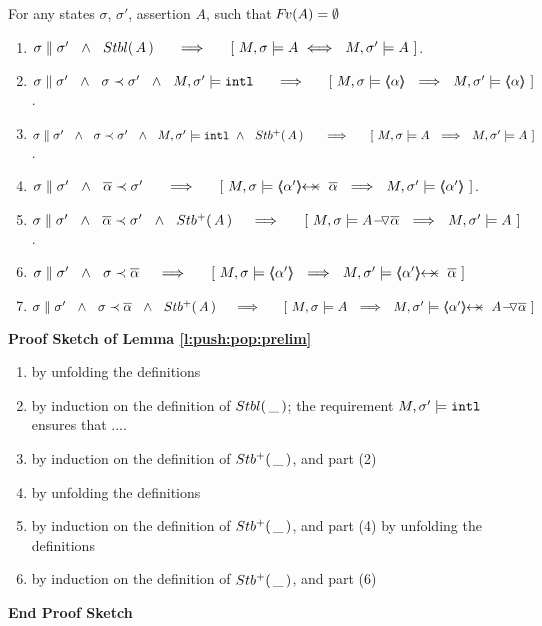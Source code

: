 \begin{lemma}
For any states $\sigma$, $\sigma'$, assertion $A$,  such that ${\hspace{-1pt}F\hspace{-1pt}}v(A)=\emptyset$
\label{l:push:pop:prelim}
\begin{enumerate}
\item
$\sigma \parallel \sigma'\ \ \wedge \ \ {Stbl(\, A\, )}\  \ \ \ \ \Longrightarrow\  \ \ \ \ [ \ M, \sigma \models A  \ \Longleftrightarrow \ \ M, \sigma' \models A\ ] $.
\item
$\sigma \parallel \sigma'\ \ \wedge \ \ \sigma \prec \sigma'\ \ \wedge  \ \ M, \sigma' \models \intThis\  \ \ \ \ \Longrightarrow\  \ \ \ \ [ \ M, \sigma \models \inside \alpha \ \ \Longrightarrow \ \ M, \sigma' \models  \inside \alpha\ ]$.
\item
$\sigma \parallel \sigma'\ \ \wedge \ \ \sigma \prec \sigma'\ \ \wedge  \ \ M, \sigma' \models \mbox{\normalfont{\texttt{intl}}}\ \wedge \ \ {Stb^+(\, A\, )} \  \ \ \ \ \Longrightarrow\  \ \ \ \ [ \ M, \sigma \models A \ \ \Longrightarrow \ \ M, \sigma' \models A\ ]$.
\item
 $\sigma \parallel \sigma'\ \ \wedge \ \ \overline \alpha \prec \sigma'\  \ \ \ \ \Longrightarrow\  \ \ \ \ [ \ M, \sigma \models \protectedFrom {\alpha'} {\overline \alpha} \ \ \Longrightarrow \ \ M, \sigma' \models \inside {\alpha'}\ ]$.
\item
 $\sigma \parallel \sigma'\ \ \wedge \ \ \overline \alpha \prec \sigma'\ \  \wedge \ \ {Stb^+(\, A\, )}   \ \ \ \ \Longrightarrow\  \ \ \ \ [ \ M, \sigma \models  {\ensuremath{ {A} \!-\!\!\!\,\!{\triangledown} \overline{\alpha} }}  \ \ \Longrightarrow \ \ M, \sigma' \models A\ ]$.
\item
$\sigma \parallel \sigma'\ \ \wedge \ \ \sigma \prec {\overline \alpha}%
  \ \ \ \ \Longrightarrow\  \ \ \ \ [ \ M, \sigma   \models \inside {\alpha'} \ \ \Longrightarrow \ \ M, \sigma' \models \protectedFrom {\alpha'} {\overline \alpha} \ ]$
\item
$\sigma \parallel \sigma'\ \ \wedge \ \ \sigma \prec {\overline \alpha}\ \  \wedge \ \ \Pos A   \ \ \ \ \Longrightarrow\  \ \ \ \ [ \ M, \sigma   \models A \ \ \Longrightarrow \ \ M, \sigma' \models \protectedFrom {\alpha'} {\PushAS   {\alpha} {A}} \ ]$
\end{enumerate}
\end{lemma}

{\textbf{Proof Sketch  of Lemma \ref{l:push:pop:prelim}}}
\begin{enumerate}
\item
by unfolding the definitions
\item
by induction on the definition of ${Stbl(\, \_\, )}$; the requirement $M, \sigma' \models \mbox{\normalfont{\texttt{intl}}}$ ensures that ....
\item
by induction on the definition of ${Stb^+(\, \_\, )}$, and part (2)
\item
by unfolding the definitions
\item
by induction on the definition of ${Stb^+(\, \_\, )}$, and part (4)
by unfolding the definitions
\item
by induction on the definition of ${Stb^+(\, \_\, )}$, and part (6)

\end{enumerate}
{\textbf{End Proof Sketch}}


